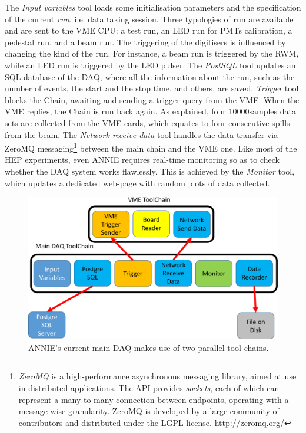 The \emph{Input variables} tool loads some initialisation parameters and the specification of %
the current \emph{run}, i.e. data taking session.
Three typologies of run are available and are sent to the VME CPU: a test run, an LED run for PMTs %
calibration, a pedestal run, and a beam run.
The triggering of the digitisers is influenced by changing the kind of the run.
For instance, a beam run is triggered by the RWM, while an LED run is triggered by the LED pulser.
The \emph{PostSQL} tool updates an SQL database of the DAQ, where all the information about %
the run, such as the number of events, the start and the stop time, and others, are saved.
\emph{Trigger} tool blocks the Chain, awaiting and sending a trigger query from the VME.
When the VME replies, the Chain is run back again.
As explained, four 10000samples data sets are collected from the VME cards, which equates to %
four consecutive spills from the beam.
The \emph{Network receive data} tool handles the data transfer via ZeroMQ %
messaging\footnote{\emph{ZeroMQ} %
  is a high-performance asynchronous messaging library, aimed at use in distributed applications.
  The API provides \emph{sockets}, each of which can represent a many-to-many connection %
  between endpoints, operating with a message-wise granularity.
  ZeroMQ is developed by a large community of contributors and distributed under the LGPL license.
  http://zeromq.org/} %
between the main chain and the VME one.
Like most of the HEP experiments, even ANNIE requires real-time monitoring so as to check whether %
the DAQ system works flawlessly.
This is achieved by the \emph{Monitor} tool, which updates a dedicated web-page with %
random plots of data collected.

\begin{figure}[]
  \centering
  \includegraphics[scale=0.20]{pics/pag2richardshkmeeting}
  \caption{ANNIE's current main DAQ makes use of two parallel tool chains.}
  \label{fig:anniedaq}
\end{figure}

